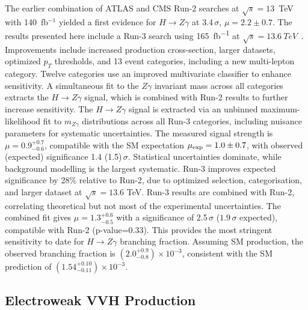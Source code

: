 \documentclass[a4paper,11pt]{article}
\begin{document}
The earlier combination of ATLAS and CMS Run-2 searches at
$\sqrt{s}=13$~TeV with 140~fb$^{-1}$ yielded a first evidence for $H
\to Z\gamma$ at 3.4\,$\sigma$, $\mu = 2.2 \pm 0.7$. The results
presented here include a Run-3 search using \SI{165}{fb^{-1}} at
$\sqrt{s}=\SI{13.6}{TeV}$~\cite{hzgamma-atlas}. Improvements include
increased production cross-section, larger datasets, optimized $p_T$
thresholds, and 13 event categories, including a new multi-lepton
category. Twelve categories use an improved multivariate classifier to
enhance sensitivity. A simultaneous fit to the $Z\gamma$ invariant
mass across all categories extracts the $H \to Z\gamma$ signal, which
is combined with Run-2 results to further increase sensitivity.
%
The $H\to Z\gamma$ signal is extracted via an unbinned
maximum-likelihood fit to $m_{Z\gamma}$ distributions across all Run-3
categories, including nuisance parameters for systematic
uncertainties.  The measured signal strength is $\mu =
0.9^{+0.7}_{-0.6}$, compatible with the SM expectation $\mu_{\rm exp}
= 1.0\pm0.7$, with observed (expected) significance 1.4
(1.5)\,$\sigma$.  Statistical uncertainties dominate, while background
modelling is the largest systematic.  Run-3 improves expected
significance by 28\% relative to Run-2, due to optimized selection,
categorisation, and larger dataset at $\sqrt{s}=13.6$ TeV.  Run-3
results are combined with Run-2, correlating theoretical but not most
of the experimental uncertainties.  The combined fit gives $\mu =
1.3^{+0.6}_{-0.5}$ with a significance of 2.5\,$\sigma$ ($1.9\,\sigma$
expected), compatible with Run-2 (p-value=0.33).  This provides the
most stringent sensitivity to date for $H\to Z\gamma$ branching
fraction.  Assuming SM production, the observed branching fraction is
$(2.0^{+0.9}_{-0.8})\times 10^{-3}$, consistent with the SM prediction
of $(1.54^{+0.10}_{-0.11})\times 10^{-3}$.


\subsection{Electroweak VVH Production}
\end{document}
